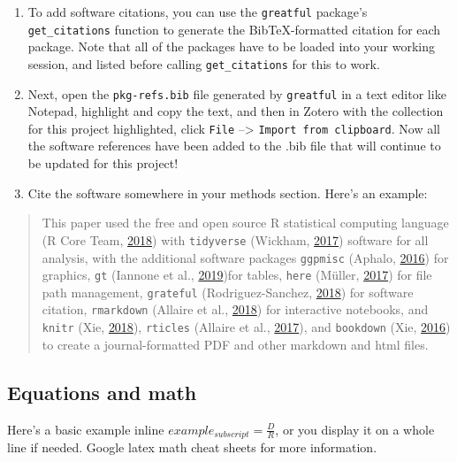 \documentclass[]{elsarticle} %
\begin{document}
\begin{enumerate}
\def\labelenumi{\arabic{enumi}.}
\setcounter{enumi}{4}
\item
  To add software citations, you can use the \texttt{greatful} package's \texttt{get\_citations} function to generate the BibTeX-formatted citation for each package. Note that all of the packages have to be loaded into your working session, and listed before calling \texttt{get\_citations} for this to work.
\item
  Next, open the \texttt{pkg-refs.bib} file generated by \texttt{greatful} in a text editor like Notepad, highlight and copy the text, and then in Zotero with the collection for this project highlighted, click \texttt{File} --\textgreater{} \texttt{Import\ from\ clipboard}. Now all the software references have been added to the .bib file that will continue to be updated for this project!
\item
  Cite the software somewhere in your methods section. Here's an example:
\end{enumerate}

\begin{quote}
This paper used the free and open source R statistical computing language (R Core Team, \protect\hyperlink{ref-base}{2018}) with \texttt{tidyverse} (Wickham, \protect\hyperlink{ref-tidyverse}{2017}) software for all analysis, with the additional software packages \texttt{ggpmisc} (Aphalo, \protect\hyperlink{ref-ggpmisc}{2016}) for graphics, \texttt{gt} (Iannone et al., \protect\hyperlink{ref-gt}{2019})for tables, \texttt{here} (Müller, \protect\hyperlink{ref-here}{2017}) for file path management, \texttt{grateful} (Rodriguez-Sanchez, \protect\hyperlink{ref-grateful}{2018}) for software citation, \texttt{rmarkdown} (Allaire et al., \protect\hyperlink{ref-rmarkdown}{2018}) for interactive notebooks, and \texttt{knitr} (Xie, \protect\hyperlink{ref-knitr}{2018}), \texttt{rticles} (Allaire et al., \protect\hyperlink{ref-rticles}{2017}), and \texttt{bookdown} (Xie, \protect\hyperlink{ref-bookdown}{2016}) to create a journal-formatted PDF and other markdown and html files.
\end{quote}

\hypertarget{equations-and-math}{%
\subsection{Equations and math}\label{equations-and-math}}

Here's a basic example inline \(example_{subscript} = \frac{D}{R}\), or you display it on a whole line if needed. Google latex math cheat sheets for more information.
\end{document}
